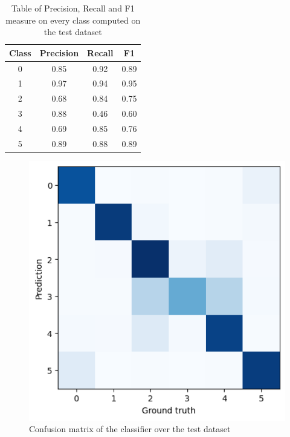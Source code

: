 \documentclass[12pt,journal,compsoc]{IEEEtran}
\begin{document}
\begin{table}[ht]
	\centering
	\begin{tabular}{c c c c }
		Class & Precision & Recall & F1  \\
		\hline
		0 & 0.85 & 0.92 &  0.89     \\
		1 & 0.97 & 0.94 &0.95       \\
		2 & 0.68 &0.84  &0.75       \\
		3 & 0.88 &0.46  &0.60       \\ 
		4 & 0.69 &0.85  &0.76       \\
		5 & 0.89 & 0.88 &0.89       \\
		
	\end{tabular}
	\caption{Table of Precision, Recall and F1 measure on every class computed on the test dataset}
	\end{table}
	\begin{figure}[H]
		\begin{center}
		\includegraphics[scale=.75]{./images/confmat_vgg16.png}
		\end{center}
		\caption{Confusion matrix of the classifier over the test dataset}
	\end{figure}
\end{document}
